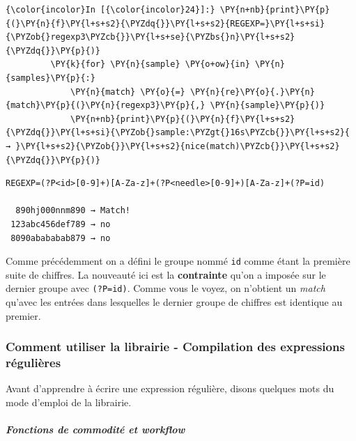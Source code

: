     \begin{Verbatim}[commandchars=\\\{\}]
{\color{incolor}In [{\color{incolor}24}]:} \PY{n+nb}{print}\PY{p}{(}\PY{n}{f}\PY{l+s+s2}{\PYZdq{}}\PY{l+s+s2}{REGEXP=}\PY{l+s+si}{\PYZob{}regexp3\PYZcb{}}\PY{l+s+se}{\PYZbs{}n}\PY{l+s+s2}{\PYZdq{}}\PY{p}{)}
         \PY{k}{for} \PY{n}{sample} \PY{o+ow}{in} \PY{n}{samples}\PY{p}{:}
             \PY{n}{match} \PY{o}{=} \PY{n}{re}\PY{o}{.}\PY{n}{match}\PY{p}{(}\PY{n}{regexp3}\PY{p}{,} \PY{n}{sample}\PY{p}{)}
             \PY{n+nb}{print}\PY{p}{(}\PY{n}{f}\PY{l+s+s2}{\PYZdq{}}\PY{l+s+si}{\PYZob{}sample:\PYZgt{}16s\PYZcb{}}\PY{l+s+s2}{ → }\PY{l+s+s2}{\PYZob{}}\PY{l+s+s2}{nice(match)\PYZcb{}}\PY{l+s+s2}{\PYZdq{}}\PY{p}{)}    
\end{Verbatim}


    \begin{Verbatim}[commandchars=\\\{\}]
REGEXP=(?P<id>[0-9]+)[A-Za-z]+(?P<needle>[0-9]+)[A-Za-z]+(?P=id)

  890hj000nnm890 → Match!
 123abc456def789 → no
 8090abababab879 → no

    \end{Verbatim}

    Comme précédemment on a défini le groupe nommé \texttt{id} comme étant
la première suite de chiffres. La nouveauté ici est la
\textbf{contrainte} qu'on a imposée sur le dernier groupe avec
\texttt{(?P=id)}. Comme vous le voyez, on n'obtient un \emph{match}
qu'avec les entrées dans lesquelles le dernier groupe de chiffres est
identique au premier.

    \hypertarget{comment-utiliser-la-librairie---compilation-des-expressions-ruxe9guliuxe8res}{%
\subsubsection{Comment utiliser la librairie - Compilation des
expressions
régulières}\label{comment-utiliser-la-librairie---compilation-des-expressions-ruxe9guliuxe8res}}

    Avant d'apprendre à écrire une expression régulière, disons quelques
mots du mode d'emploi de la librairie.
\newpage
    \hypertarget{fonctions-de-commodituxe9-et-workflow}{%
\subparagraph{\texorpdfstring{Fonctions de commodité et
\emph{workflow}\\\\}{Fonctions de commodité et workflow}}\label{fonctions-de-commodituxe9-et-workflow}}

